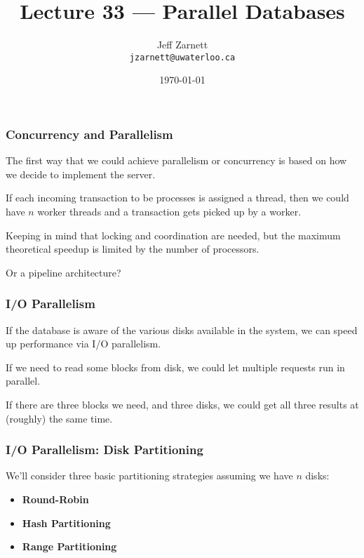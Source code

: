 

\title{Lecture 33 --- Parallel Databases }

\author{Jeff Zarnett \\ \small \texttt{jzarnett@uwaterloo.ca}}
\date{\today}




\begin{frame}
  \titlepage

 \end{frame}
 
 

\begin{frame}
\frametitle{Concurrency and Parallelism}

The first way that we could achieve parallelism or concurrency is based on how we decide to implement the server. 

If each incoming transaction to be processes is assigned a thread, then we could have $n$ worker threads and a transaction gets picked up by a worker. 

Keeping in mind that locking and coordination are needed, but the maximum theoretical speedup is limited by the number of processors.

Or a pipeline architecture?

\end{frame}

\begin{frame}
\frametitle{I/O Parallelism}

If the database is aware of the various disks available in the system, we can speed up performance via I/O parallelism. 

If we need to read some blocks from disk, we could let multiple requests run in parallel. 

If there are three blocks we need, and three disks, we could get all three results at (roughly) the same time. 

\end{frame}


\begin{frame}
\frametitle{I/O Parallelism: Disk Partitioning}

We'll consider three basic partitioning strategies assuming we have $n$ disks:
\begin{itemize}
	\item \textbf{Round-Robin}
	\item \textbf{Hash Partitioning}
	\item \textbf{Range Partitioning}
\end{itemize}

\end{frame}


